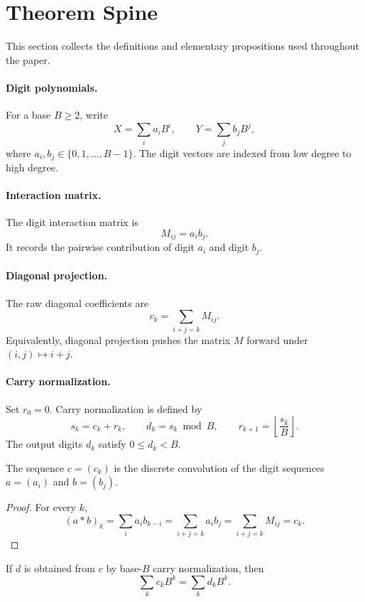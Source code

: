 \section{Theorem Spine}

This section collects the definitions and elementary propositions used
throughout the paper.

\paragraph{Digit polynomials.}
For a base \(B\ge 2\), write
\[
    X=\sum_i a_i B^i,\qquad Y=\sum_j b_j B^j,
\]
where \(a_i,b_j\in\{0,1,\ldots,B-1\}\). The digit vectors are indexed from
low degree to high degree.

\paragraph{Interaction matrix.}
The digit interaction matrix is
\[
    M_{ij}=a_i b_j.
\]
It records the pairwise contribution of digit \(a_i\) and digit \(b_j\).

\paragraph{Diagonal projection.}
The raw diagonal coefficients are
\[
    c_k=\sum_{i+j=k} M_{ij}.
\]
Equivalently, diagonal projection pushes the matrix \(M\) forward under
\((i,j)\mapsto i+j\).

\paragraph{Carry normalization.}
Set \(r_0=0\). Carry normalization is defined by
\[
    s_k=c_k+r_k,\qquad
    d_k=s_k\bmod B,\qquad
    r_{k+1}=\left\lfloor \frac{s_k}{B}\right\rfloor.
\]
The output digits \(d_k\) satisfy \(0\le d_k<B\).

\begin{proposition}
The sequence \(c=(c_k)\) is the discrete convolution of the digit sequences
\(a=(a_i)\) and \(b=(b_j)\).
\end{proposition}

\begin{proof}
For every \(k\),
\[
    (a*b)_k=\sum_i a_i b_{k-i}=\sum_{i+j=k}a_i b_j=\sum_{i+j=k}M_{ij}=c_k.
\]
\end{proof}

\begin{proposition}
If \(d\) is obtained from \(c\) by base-\(B\) carry normalization, then
\[
    \sum_k c_k B^k=\sum_k d_k B^k.
\]
\end{proposition}

